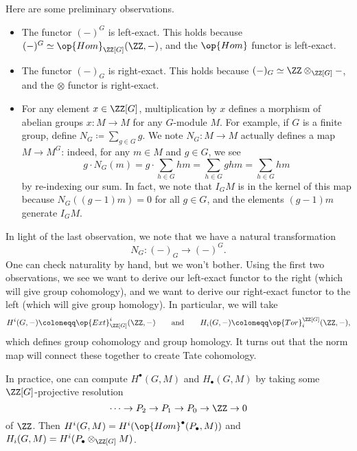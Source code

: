 \documentclass[../notes.tex]{subfiles}
\begin{document}
Here are some preliminary observations.
\begin{itemize}
	\item The functor $(-)^G$ is left-exact. This holds because $(-)^G\simeq\op{Hom}_{\ZZ[G]}(\ZZ,-)$, and the $\op{Hom}$ functor is left-exact.
	\item The functor $(-)_G$ is right-exact. This holds because $(-)_G\simeq\ZZ\otimes_{\ZZ[G]}-$, and the $\otimes$ functor is right-exact.
	\item For any element $x\in\ZZ[G]$, multiplication by $x$ defines a morphism of abelian groups $x\colon M\to M$ for any $G$-module $M$. For example, if $G$ is a finite group, define $N_G\coloneqq\sum_{g\in G}g$. We note $N_G\colon M\to M$ actually defines a map $M\to M^G$: indeed, for any $m\in M$ and $g\in G$, we see
	\[g\cdot N_G(m)=g\cdot\sum_{h\in G}hm=\sum_{h\in G}ghm=\sum_{h\in G}hm\]
	by re-indexing our sum. In fact, we note that $I_GM$ is in the kernel of this map because $N_G((g-1)m)=0$ for all $g\in G$, and the elements $(g-1)m$ generate $I_GM$.
\end{itemize}
In light of the last observation, we note that we have a natural transformation
\[N_G\colon(-)_G\to(-)^G.\]
One can check naturality by hand, but we won't bother. Using the first two observations, we see we want to derive our left-exact functor to the right (which will give group cohomology), and we want to derive our right-exact functor to the left (which will give group homology). In particular, we will take
\[H^i(G,-)\coloneqq\op{Ext}^i_{\ZZ[G]}(\ZZ,-)\qquad\text{and}\qquad H_i(G,-)\coloneqq\op{Tor}_i^{\ZZ[G]}(\ZZ,-),\]
which defines group cohomology and group homology. It turns out that the norm map will connect these together to create Tate cohomology.
\begin{remark}
	In practice, one can compute $H^\bullet(G,M)$ and $H_\bullet(G,M)$ by taking some $\ZZ[G]$-projective resolution
	\[\cdots\to P_2\to P_1\to P_0\to\ZZ\to0\]
	of $\ZZ$. Then $H^i(G,M)=H^i(\op{Hom}^\bullet(P_\bullet,M))$ and $H_i(G,M)=H^i(P_\bullet\otimes_{\ZZ[G]}M)$.
\end{remark}
\end{document}
